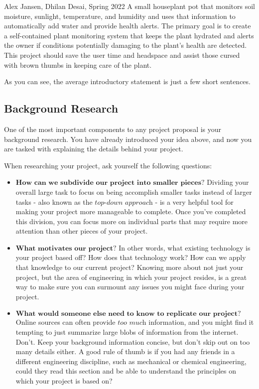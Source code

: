 \documentclass{article}
\begin{document}
\vspace{3mm}

\begin{pquotation}{Alex Jansen, Dhilan Desai, Spring 2022}
A small houseplant pot that monitors soil moisture, sunlight, temperature, and humidity and uses that information to automatically add water and provide health alerts. The primary goal is to create a self-contained plant monitoring system that keeps the plant hydrated and alerts the owner if conditions potentially damaging to the plant's health are detected. This project should save the user time and headspace and assist those cursed with brown thumbs in keeping care of the plant. 
\end{pquotation}

As you can see, the average introductory statement is just a few short sentences. 

\subsection{Background Research}

One of the most important components to any project proposal is your background research. You have already introduced your idea above, and now you are tasked with explaining the details behind your project. 

\vspace{5mm}

When researching your project, ask yourself the following questions:

\begin{itemize}

\item 
$\textbf{How can we subdivide our project into smaller pieces?}$ Dividing your overall large task to focus on being accomplish smaller tasks instead of larger tasks - also known as the $\textit{top-down approach}$ - is a very helpful tool for making your project more manageable to complete. Once you've completed this division, you can focus more on individual parts that may require more attention than other pieces of your project.


\item $\textbf{What motivates our project?}$ In other words, what existing technology is your project based off? How does that technology work? How can we apply that knowledge to our current project? Knowing more about not just your project, but the area of engineering in which your project resides, is a great way to make sure you can surmount any issues you might face during your project.

\item $\textbf{What would someone else need to know to replicate our project?}$ Online sources can often provide $\textit{too much}$ information, and you might find it tempting to just summarize large blobs of information from the internet. Don't. Keep your background information concise, but don't skip out on too many details either. A good rule of thumb is if you had any friends in a different engineering discipline, such as mechanical or chemical engineering, could they read this section and be able to understand the principles on which your project is based on? 
\end{itemize}
\end{document}
